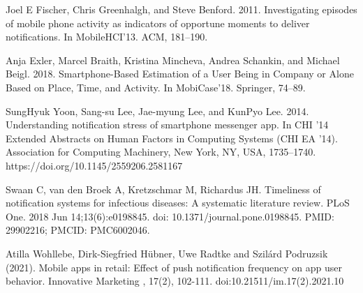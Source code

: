 \documentclass{vgtc}                          %
\begin{document}
Joel E Fischer, Chris Greenhalgh, and Steve Benford. 2011. Investigating episodes of mobile phone activity as indicators of opportune moments to deliver notifications. In MobileHCI’13. ACM, 181–190.

Anja Exler, Marcel Braith, Kristina Mincheva, Andrea Schankin, and Michael Beigl. 2018. Smartphone-Based Estimation of a User Being in Company or Alone Based on Place, Time, and Activity. In MobiCase’18. Springer, 74–89. 

SungHyuk Yoon, Sang-su Lee, Jae-myung Lee, and KunPyo Lee. 2014. Understanding notification stress of smartphone messenger app. In CHI '14 Extended Abstracts on Human Factors in Computing Systems (CHI EA '14). Association for Computing Machinery, New York, NY, USA, 1735–1740. https://doi.org/10.1145/2559206.2581167

Swaan C, van den Broek A, Kretzschmar M, Richardus JH. Timeliness of notification systems for infectious diseases: A systematic literature review. PLoS One. 2018 Jun 14;13(6):e0198845. doi: 10.1371/journal.pone.0198845. PMID: 29902216; PMCID: PMC6002046.

Atilla Wohllebe, Dirk-Siegfried Hübner, Uwe Radtke and Szilárd Podruzsik (2021). Mobile apps in retail: Effect of push notification frequency on app user behavior. Innovative Marketing , 17(2), 102-111. doi:10.21511/im.17(2).2021.10
\end{document}
